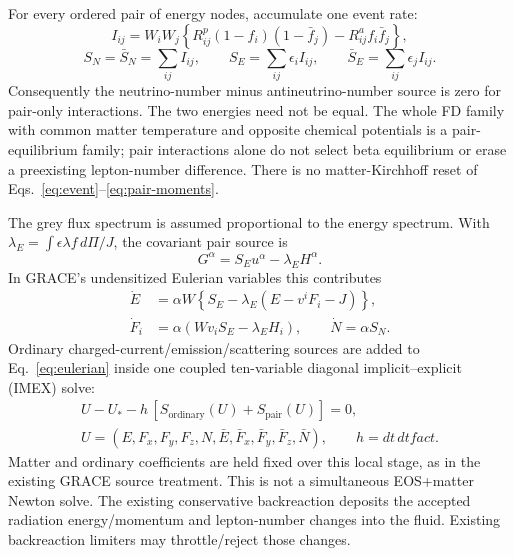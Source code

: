 \documentclass[11pt,a4paper]{article}
\newcommand{\ordinary}{\mathrm{ordinary}}
\newcommand{\pair}{\mathrm{pair}}
\begin{document}
For every ordered pair of energy nodes, accumulate one event rate:
\begin{equation}\label{eq:event}
 I_{ij}=W_iW_j\left\{R^p_{ij}(1-f_i)(1-\bar f_j)
                         -R^a_{ij}f_i\bar f_j\right\},
\end{equation}
\begin{equation}\label{eq:pair-moments}
 S_N=\bar S_N=\sum_{ij}I_{ij},\qquad
 S_E=\sum_{ij}\epsilon_iI_{ij},\qquad
 \bar S_E=\sum_{ij}\epsilon_jI_{ij}.
\end{equation}
Consequently the neutrino-number minus antineutrino-number source is zero
for pair-only interactions. The two energies need not be equal. The whole FD
family with common matter temperature and opposite chemical potentials is a
pair-equilibrium family; pair interactions alone do not select beta
equilibrium or erase a preexisting lepton-number difference. There is no
matter-Kirchhoff reset of Eqs.~\eqref{eq:event}--\eqref{eq:pair-moments}.

The grey flux spectrum is assumed proportional to the energy spectrum. With
$\lambda_E=\int\epsilon\lambda f\,d\Pi/J$, the covariant pair source is
\begin{equation}\label{eq:four-force}
 G^\alpha=S_Eu^\alpha-\lambda_EH^\alpha.
\end{equation}
In GRACE's undensitized Eulerian variables this contributes
\begin{equation}\label{eq:eulerian}
 \begin{aligned}
 \dot E&=\alpha W\left\{S_E-\lambda_E(E-v^iF_i-J)\right\},\\
 \dot F_i&=\alpha(Wv_iS_E-\lambda_EH_i),\qquad
 \dot N=\alpha S_N.
 \end{aligned}
\end{equation}
Ordinary charged-current/emission/scattering sources are added to
Eq.~\eqref{eq:eulerian} inside one coupled ten-variable diagonal
implicit--explicit (IMEX) solve:
\begin{equation}\label{eq:residual}
 \begin{gathered}
 U-U_*-h\,[S_\ordinary(U)+S_\pair(U)]=0,\\
 U=(E,F_x,F_y,F_z,N,\bar E,\bar F_x,\bar F_y,\bar F_z,\bar N),\qquad
 h=dt\,dtfact.
 \end{gathered}
\end{equation}
Matter and ordinary coefficients are held fixed over this local stage, as in
the existing GRACE source treatment. This is not a simultaneous EOS+matter
Newton solve. The existing conservative backreaction deposits the accepted
radiation energy/momentum and lepton-number changes into the fluid. Existing
backreaction limiters may throttle/reject those changes.
\end{document}
